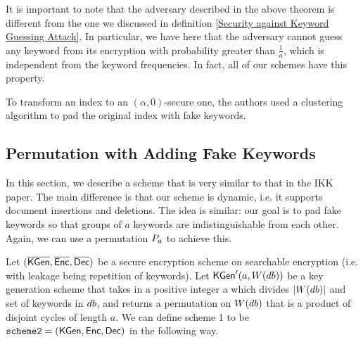 It is important to note that the adversary described in the above theorem is different from the one we discussed in definition \ref{Security against Keyword Guessing Attack}. In particular, we have here that the adversary cannot guess any keyword from its encryption with probability greater than $\frac{1}{a}$, which is independent from the keyword frequencies. In fact, all of our schemes have this property.

To transform an index to an $(\alpha, 0)$-secure one, the authors used a clustering algorithm to pad the original index with fake keywords.



\subsection{Permutation with Adding Fake Keywords}
In this section, we describe a scheme that is very similar to that in the IKK paper. The main difference is that our scheme is dynamic, i.e. it supports document insertions and deletions. The idea is similar: our goal is to pad fake keywords so that groups of $a$ keywords are indistinguishable from each other. Again, we can use a permutation $P_a$ to achieve this.

Let $(\overline{\mathsf{KGen}}, \overline{\mathsf{Enc}}, \overline{\mathsf{Dec}})$ be a secure encryption scheme on searchable encryption (i.e. with leakage being repetition of keywords). Let $\mathsf{KGen}'(a, W(db))$ be a key generation scheme that takes in a positive integer a which divides $|W(db)|$ and set of keywords in $db$, and returns a permutation on $W(db)$ that is a product of disjoint cycles of length $a$. We can define scheme 1 to be $\texttt{scheme2} = (\mathsf{KGen}, \mathsf{Enc}, \mathsf{Dec})$ in the following way.

\begin{pchstack}[center]
		
\pchspace
{}
	
\pchspace
{}
\end{pchstack}



